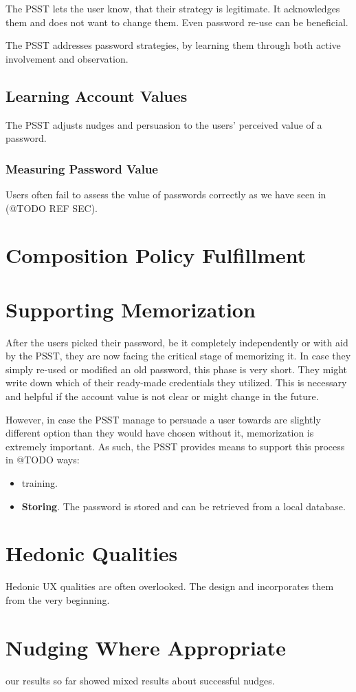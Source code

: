 The PSST lets the user know, that their strategy is legitimate. It acknowledges them and does not want to change them.  Even password re-use can be beneficial.

The PSST addresses password strategies, by learning them through both active involvement and observation. 

\subsection{Learning Account Values}
The PSST adjusts nudges and persuasion to the users' perceived value of a password. 

\subsubsection{Measuring Password Value}
Users often fail to assess the value of passwords correctly as we have seen in (@TODO REF SEC). 

\section{Composition Policy Fulfillment}

\section{Supporting Memorization}
After the users picked their password, be it completely independently or with aid by the PSST, they are now facing the critical stage of memorizing it. In case they simply re-used or modified an old password, this phase is very short. They might write down which of their ready-made credentials they utilized. This is necessary and helpful if the account value is not clear or might change in the future. 

However, in case the PSST manage to persuade a user towards are slightly different option than they would have chosen without it, memorization is extremely important. As such, the PSST provides means to support this process in @TODO ways:
\begin{itemize}
\item training. 
\item \textbf{Storing}. The password is stored and can be retrieved from a local database. 
\end{itemize}

\section{Hedonic Qualities}
Hedonic UX qualities are often overlooked. The design and incorporates them from the very beginning. 

\section{Nudging Where Appropriate}
our results so far showed mixed results about successful nudges. 



